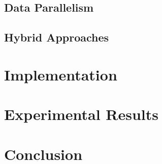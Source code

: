 \documentclass[conference,compsoc,a4paper]{IEEEtran}
\begin{document}

\subsection{Data Parallelism} %
\label{sub:data_parallelism}


\subsection{Hybrid Approaches} %
\label{sub:hybrid_approaches}





\section{Implementation} %
\label{sec:implementation}


\section{Experimental Results} %
\label{sec:experimental_results}


\section{Conclusion} %
\label{sec:conclusion}





\end{document}

